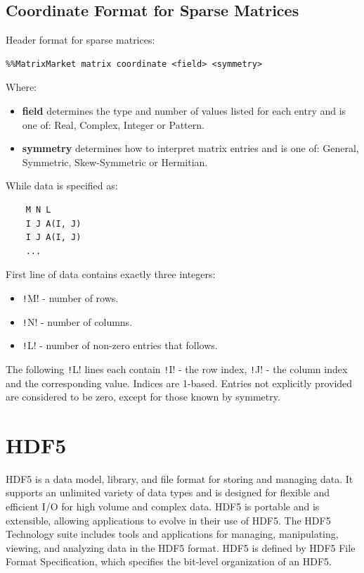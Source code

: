 \documentclass[thesis=M,english]{FITthesis}[2019/12/23]
\newcommand{\csre}[1]{\texttt!#1!}
\begin{document}
\subsection{Coordinate Format for Sparse Matrices}

Header format for sparse matrices:
\begin{lstlisting}
%%MatrixMarket matrix coordinate <field> <symmetry>
\end{lstlisting}

Where:
\begin{itemize}
    \item \textbf{field} determines the type and number of values listed for each entry
          and is one of: Real, Complex, Integer or Pattern.
    \item \textbf{symmetry} determines how to interpret matrix entries
          and is one of: General, Symmetric, Skew-Symmetric or Hermitian.
\end{itemize}

While data is specified as:
\begin{lstlisting}
    M N L
    I J A(I, J)
    I J A(I, J)
    ...
\end{lstlisting}

First line of data contains exactly three integers:
\begin{itemize}
    \item \csre{M} - number of rows.
    \item \csre{N} - number of columns.
    \item \csre{L} - number of non-zero entries that follows.
\end{itemize}

The following \csre{L} lines each contain \csre{I} - the row index, \csre{J} - the column index
and the corresponding value. Indices are 1-based. Entries not explicitly provided are considered
to be zero, except for those known by symmetry.


\section{HDF5}\label{theory:HDF5}

HDF5 is a data model, library, and file format for storing and managing data.
It supports an unlimited variety of data types and is designed for flexible and
efficient I/O for high volume and complex data. HDF5 is portable and is extensible,
allowing applications to evolve in their use of HDF5. The HDF5 Technology suite includes
tools and applications for managing, manipulating, viewing, and analyzing data in the HDF5 format.
\cite{hdf5} HDF5 is defined by HDF5 File Format Specification, which specifies the bit-level
organization of an HDF5.
\end{document}
